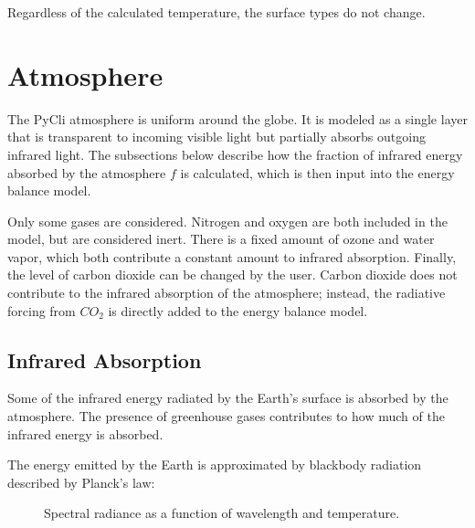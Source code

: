 \documentclass[12pt]{article} %
\begin{document}
Regardless of the calculated temperature, the surface types do not change.


\newpage
\section{Atmosphere}
\label{sec:atmos}

The PyCli atmosphere is uniform around the globe. It is modeled as a single layer that is transparent to incoming visible light but partially absorbs outgoing infrared light. The subsections below describe how the fraction of infrared energy absorbed by the atmosphere $f$ is calculated, which is then input into the energy balance model.

Only some gases are considered. Nitrogen and oxygen are both included in the model, but are considered inert. There is a fixed amount of ozone and water vapor, which both contribute a constant amount to infrared absorption. Finally, the level of carbon dioxide can be changed by the user. Carbon dioxide does not contribute to the infrared absorption of the atmosphere; instead, the radiative forcing from $CO_2$ is directly added to the energy balance model.


\subsection{Infrared Absorption}

Some of the infrared energy radiated by the Earth's surface is absorbed by the atmosphere. The presence of greenhouse gases contributes to how much of the infrared energy is absorbed.

The energy emitted by the Earth is approximated by blackbody radiation described by Planck's law:

\begin{figure}[H]
	\caption{Spectral radiance as a function of wavelength and temperature.}
	\label{fig:planck_law}
\end{figure}
\end{document}
